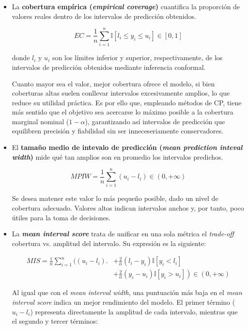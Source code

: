 \begin{itemize}
    \item La \textbf{cobertura empírica (\textit{empirical coverage})} cuantifica la proporción de valores reales dentro de los intervalos de predicción obtenidos. 
    
    $$
    EC = \frac{1}{n} 
        \sum_{i=1}^n{ \mathbb{I} \left[ l_i \le y_i \le u_i \right] } 
            \in \left[0, 1\right]
    $$

    donde $l_i$ y $u_i$ son los límites inferior y superior, respectivamente, de los intervalos de predicción obtenidos mediante inferencia conformal.

    Cuanto mayor sea el valor, mejor cobertura ofrece el modelo, si bien coberturas altas suelen conllevar intervalos excesivamente amplios, lo que reduce su utilidad práctica. Es por ello que, empleando métodos de CP, tiene más sentido que el objetivo sea acercarse lo máximo posible a la cobertura marginal nominal ($1-\alpha$), garantizando así intervalos de predicción que equilibren precisión y fiabilidad sin ser inneceseriamente conservadores. 
    
    \item El \textbf{tamaño medio de intevalo de predicción (\textit{mean prediction inteval width})} mide qué tan amplios son en promedio los intervalos predichos.
    
    $$
    MPIW = \frac{1}{n} \sum_{i=1}^n{ \left( u_i - l_i \right) } \in (0, +\infty)
    $$
    
    Se desea matener este valor lo más pequeño posible, dado un nivel de cobertura adecuado. Valores altos indican intervalos anchos y, por tanto, poco útiles para la toma de decisiones. 

    \item La \textbf{\textit{mean interval score}} \cite{gneiting2007} trata de unificar en una sola métrica el \textit{trade-off} cobertura vs. amplitud del intervalo. Su expresión es la siguiente:

    \begin{align*} 
    MIS = \frac{1}{n} \sum_{i=1}^n
    \biggl( (u_i-l_i) \biggr.&+ \frac{2}{\alpha} \left( l_i-y_i \right) \mathbb{I}\left[ y_i<l_i \right] \\
    &+\left. \frac{2}{\alpha}  \left( y_i-u_i \right) \mathbb{I}\left[ y_i>u_i \right] \right)
    \in \left( 0, +\infty \right)
    \end{align*}

    Al igual que con el \textit{mean interval width}, una puntuación más baja en el \textit{mean interval score} indica un mejor rendimiento del modelo. El primer término ($u_i-l_i$) representa directamente la amplitud de cada intervalo, mientras que el segundo y tercer términos:


\end{itemize}
